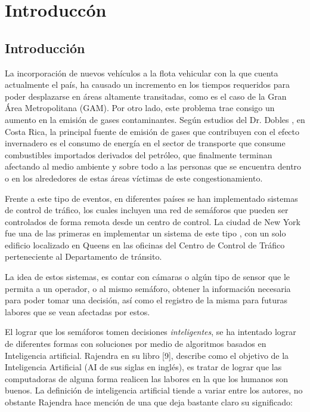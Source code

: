 \chapter{Introducc\'{o}n}
	\label{chap:introduction}
	
	\section{Introducci\'{o}n}

		 
		La incorporaci\'{o}n de nuevos veh\'{i}culos a la flota vehicular con la que cuenta
	actualmente el pa\'{i}s, ha causado un incremento en los tiempos requeridos para
	poder desplazarse en \'{a}reas altamente transitadas, como es el caso de la Gran
	\'{A}rea Metropolitana (GAM). Por otro lado, este problema trae consigo un aumento
	en la emisi\'{o}n de gases contaminantes. Seg\'{u}n estudios del Dr. Dobles
	\cite{Robles2011} , en Costa Rica, la principal fuente de emisi\'{o}n de gases que contribuyen con el efecto invernadero es el consumo de energ\'{i}a en el sector de transporte que consume combustibles importados derivados del petr\'{o}leo, que finalmente terminan afectando al medio ambiente y sobre todo a las personas que se encuentra dentro o en los alrededores de estas \'{a}reas v\'{i}ctimas de este congestionamiento.
	
		Frente a este tipo de eventos, en diferentes pa\'{i}ses se han implementado
	sistemas de control de tr\'{a}fico, los cuales incluyen una red de sem\'{a}foros que
	pueden ser controlados de forma remota desde un centro de control. La ciudad de
	New York fue una de las primeras en implementar un sistema de este tipo
	\cite{Greenman1998}, con un solo edificio localizado en Queens en las oficinas
	del Centro de Control de Tr\'{a}fico perteneciente al Departamento de tr\'{a}nsito.
	
		La idea de estos sistemas, es contar con c\'{a}maras o alg\'{u}n tipo de sensor que le
	permita a un operador, o al mismo sem\'{a}foro, obtener la informaci\'{o}n necesaria
	para poder tomar una decisi\'{o}n, as\'{i} como el registro de la misma para futuras
	labores que se vean afectadas por estos.
	
		El lograr que los sem\'{a}foros tomen decisiones \textit{inteligentes}, se ha
	intentado lograr de diferentes formas con soluciones por medio de  algoritmos basados en Inteligencia
	artificial. Rajendra en su libro [9], describe como el objetivo de la
	Inteligencia Artificial (AI de sus siglas en ingl\'{e}s), es tratar de lograr que
	las computadoras de alguna forma realicen las labores en la que los humanos son
	buenos. La definici\'{o}n de inteligencia artificial tiende a variar entre los
	autores, no obstante Rajendra hace menci\'{o}n de una que deja bastante claro su significado:

